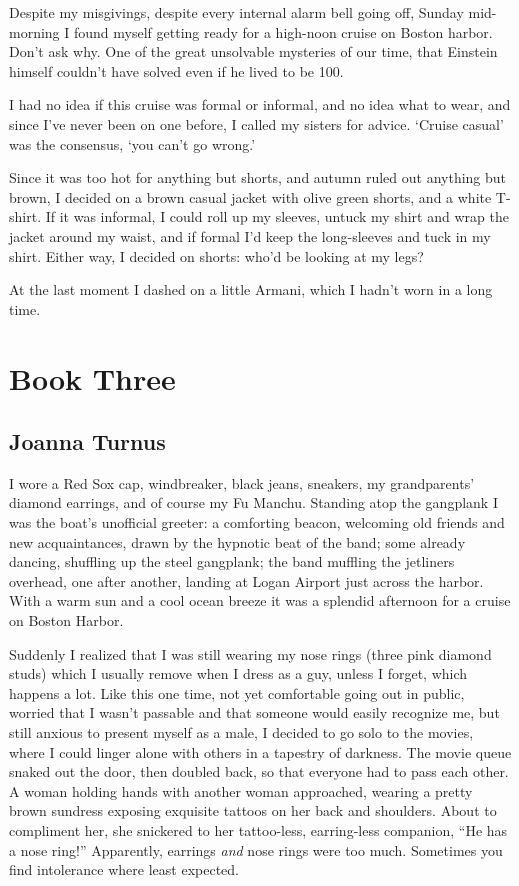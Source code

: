 \titlemark

Despite my misgivings, despite every internal alarm bell going off,
Sunday mid-morning I found myself getting ready for a high-noon cruise
on Boston harbor. Don't ask why. One of the great unsolvable mysteries
of our time, that Einstein himself couldn't have solved even if he lived
to be 100.

I had no idea if this cruise was formal or informal, and no idea what to
wear, and since I've never been on one before, I called my sisters for
advice. `Cruise casual' was the consensus, `you can't go wrong.'

Since it was too hot for anything but shorts, and autumn ruled out
anything but brown, I decided on a brown casual jacket with olive green
shorts, and a white T-shirt. If it was informal, I could roll up my
sleeves, untuck my shirt and wrap the jacket around my waist, and if
formal I'd keep the long-sleeves and tuck in my shirt. Either way, I
decided on shorts: who'd be looking at my legs?

At the last moment I dashed on a little Armani, which I hadn't worn in a
long time.

\part{Book Three}\setcounter{chapter}{0}

\chapter{Joanna Turnus}

\titlemark

I wore a Red Sox cap, windbreaker, black jeans, sneakers, my
grandparents' diamond earrings, and of course my Fu Manchu. Standing
atop the gangplank I was the boat's unofficial greeter: a comforting
beacon, welcoming old friends and new acquaintances, drawn by the
hypnotic beat of the band; some already dancing, shuffling up the steel
gangplank; the band muffling the jetliners overhead, one after another,
landing at Logan Airport just across the harbor. With a warm sun and a
cool ocean breeze it was a splendid afternoon for a cruise on Boston
Harbor.

Suddenly I realized that I was still wearing my nose rings (three pink
diamond studs) which I usually remove when I dress as a guy, unless I
forget, which happens a lot. Like this one time, not yet comfortable
going out in public, worried that I wasn't passable and that someone
would easily recognize me, but still anxious to present myself as a
male, I decided to go solo to the movies, where I could linger alone
with others in a tapestry of darkness. The movie queue snaked out the
door, then doubled back, so that everyone had to pass each other. A
woman holding hands with another woman approached, wearing a pretty
brown sundress exposing exquisite tattoos on her back and shoulders.
About to compliment her, she snickered to her tattoo-less, earring-less
companion, ``He has a nose ring!'' Apparently, earrings \emph{and} nose
rings were too much. Sometimes you find intolerance where least
expected.

